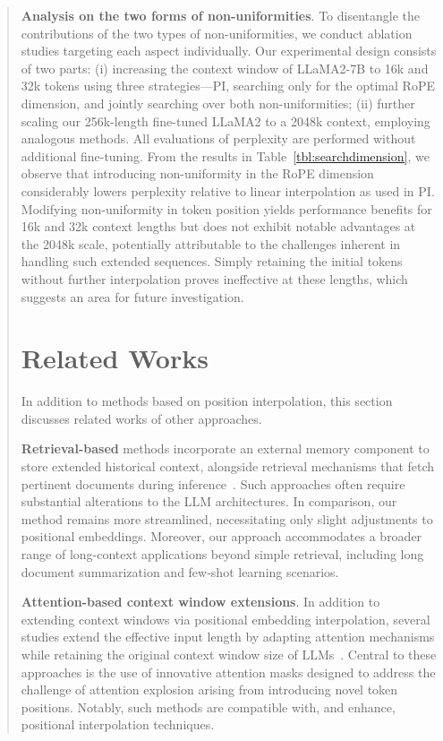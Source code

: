 \begin{abstract}
\textbf{Analysis on the two forms of non-uniformities}. To disentangle the contributions of the two types of non-uniformities, we conduct ablation studies targeting each aspect individually. Our experimental design consists of two parts: (i) increasing the context window of LLaMA2-7B to 16k and 32k tokens using three strategies—PI, searching only for the optimal RoPE dimension, and jointly searching over both non-uniformities; (ii) further scaling our 256k-length fine-tuned LLaMA2 to a 2048k context, employing analogous methods. All evaluations of perplexity are performed without additional fine-tuning. From the results in Table~\ref{tbl:searchdimension}, we observe that introducing non-uniformity in the RoPE dimension considerably lowers perplexity relative to linear interpolation as used in PI. Modifying non-uniformity in token position yields performance benefits for 16k and 32k context lengths but does not exhibit notable advantages at the 2048k scale, potentially attributable to the challenges inherent in handling such extended sequences. Simply retaining the initial tokens without further interpolation proves ineffective at these lengths, which suggests an area for future investigation.

\section{Related Works}

In addition to methods based on position interpolation, this section discusses related works of other approaches. 

\textbf{Retrieval-based} methods incorporate an external memory component to store extended historical context, alongside retrieval mechanisms that fetch pertinent documents during inference~\cite{longllama,wang2023augmenting,borgeaud2022improving}. Such approaches often require substantial alterations to the LLM architectures. In comparison, our method remains more streamlined, necessitating only slight adjustments to positional embeddings. Moreover, our approach accommodates a broader range of long-context applications beyond simple retrieval, including long document summarization and few-shot learning scenarios.

\textbf{Attention-based context window extensions}. In addition to extending context windows via positional embedding interpolation, several studies extend the effective input length by adapting attention mechanisms while retaining the original context window size of LLMs~\cite{han2023lminfinite, streamingllm,parallelwindow}. Central to these approaches is the use of innovative attention masks designed to address the challenge of attention explosion arising from introducing novel token positions. Notably, such methods are compatible with, and enhance, positional interpolation techniques.


\end{abstract}
